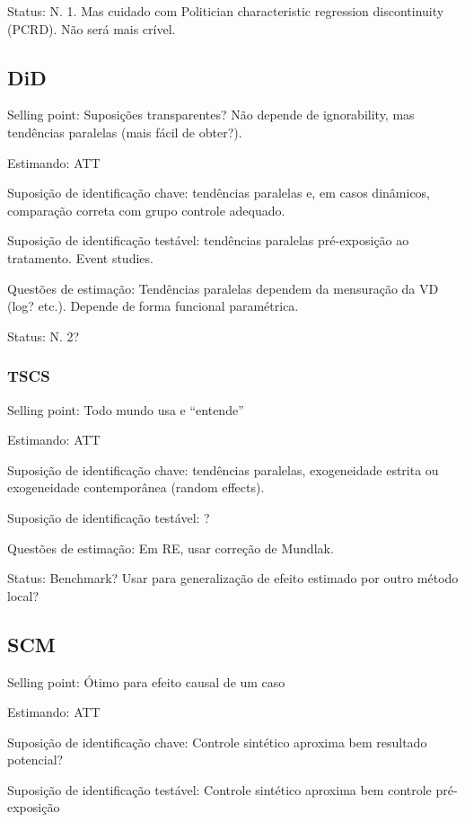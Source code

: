 \documentclass[
]{article}
\begin{document}
Status: N. 1. Mas cuidado com Politician characteristic regression discontinuity (PCRD). Não será mais crível.

\subsection{DiD}\label{did}

Selling point: Suposições transparentes? Não depende de ignorability, mas tendências paralelas (mais fácil de obter?).

Estimando: ATT

Suposição de identificação chave: tendências paralelas e, em casos dinâmicos, comparação correta com grupo controle adequado.

Suposição de identificação testável: tendências paralelas pré-exposição ao tratamento. Event studies.

Questões de estimação: Tendências paralelas dependem da mensuração da VD (log? etc.). Depende de forma funcional paramétrica.

Status: N. 2?

\subsubsection{TSCS}\label{tscs}

Selling point: Todo mundo usa e ``entende''

Estimando: ATT

Suposição de identificação chave: tendências paralelas, exogeneidade estrita ou exogeneidade contemporânea (random effects).

Suposição de identificação testável: ?

Questões de estimação: Em RE, usar correção de Mundlak.

Status: Benchmark? Usar para generalização de efeito estimado por outro método local?

\subsection{SCM}\label{scm}

Selling point: Ótimo para efeito causal de um caso

Estimando: ATT

Suposição de identificação chave: Controle sintético aproxima bem resultado potencial?

Suposição de identificação testável: Controle sintético aproxima bem controle pré-exposição
\end{document}
